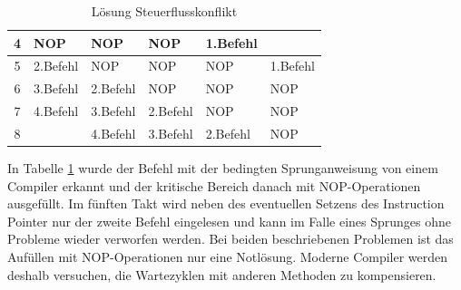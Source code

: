 \documentclass[a4paper,12pt]{article}
\begin{document}
\begin{table}[!htb]
\begin{tabular}{|c|l|l|l|l|l|}
4                       & \cellcolor[HTML]{F8A102}NOP                                                             & \cellcolor[HTML]{F8A102}NOP                                                                & \cellcolor[HTML]{F8A102}NOP                                                                 & \cellcolor[HTML]{9698ED}1.Befehl        &                                                                                               \\ \hline
5                       & \cellcolor[HTML]{38FFF8}2.Befehl                                                        & \cellcolor[HTML]{F8A102}NOP                                                                & \cellcolor[HTML]{F8A102}NOP                                                                 & \cellcolor[HTML]{F8A102}NOP             & \cellcolor[HTML]{9698ED}1.Befehl                                                              \\ \hline
6                       & \cellcolor[HTML]{67FD9A}3.Befehl                                                        & \cellcolor[HTML]{38FFF8}2.Befehl                                                           & \cellcolor[HTML]{F8A102}NOP                                                                 & \cellcolor[HTML]{F8A102}NOP             & \cellcolor[HTML]{F8A102}NOP                                                                   \\ \hline
7                       & \cellcolor[HTML]{FFFE65}4.Befehl                                                        & \cellcolor[HTML]{67FD9A}3.Befehl                                                           & \cellcolor[HTML]{38FFF8}2.Befehl                                                            & \cellcolor[HTML]{F8A102}NOP             & \cellcolor[HTML]{F8A102}NOP                                                                   \\ \hline
\multicolumn{1}{|c|}{8} &                                                                                         & \cellcolor[HTML]{FFFE65}4.Befehl                                                           & \cellcolor[HTML]{67FD9A}3.Befehl                                                            & \cellcolor[HTML]{38FFF8}2.Befehl        & \cellcolor[HTML]{F8A102}NOP                                                                   \\ \hline
\end{tabular}
\caption{Lösung Steuerflusskonflikt}
\label{tab:loesungSteuerflusskonflikt}
\end{table}
\noindent In Tabelle
 \ref{tab:loesungSteuerflusskonflikt} wurde der Befehl mit der bedingten Sprunganweisung von einem Compiler erkannt und der kritische Bereich danach mit NOP-Operationen ausgefüllt. Im fünften Takt wird neben des eventuellen Setzens des Instruction Pointer nur der zweite Befehl eingelesen und kann im Falle eines Sprunges ohne Probleme wieder verworfen werden. Bei beiden beschriebenen Problemen ist das Aufüllen mit NOP-Operationen nur eine Notlösung. Moderne Compiler werden deshalb versuchen, die Wartezyklen mit anderen Methoden zu kompensieren.
\end{document}
